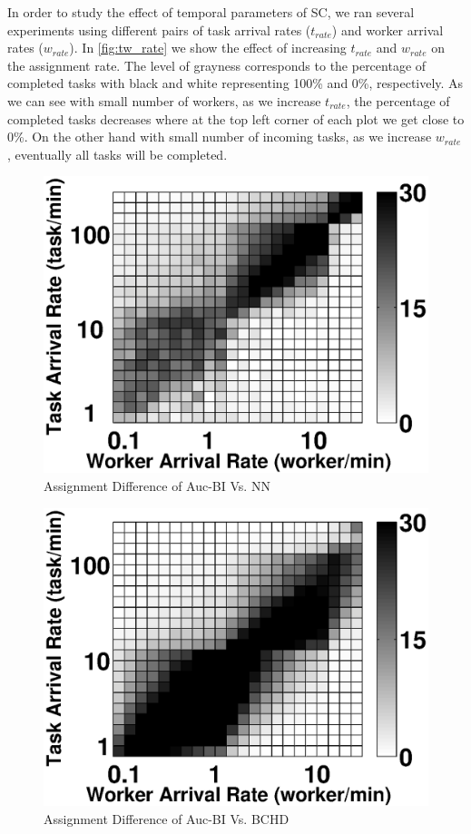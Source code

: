 In order to study the effect of temporal parameters of SC, we ran several experiments using different pairs of task arrival rates ($t_{rate}$) and worker arrival rates ($w_{rate}$). In \cref{fig:tw_rate} we show the effect of increasing $t_{rate}$ and $w_{rate}$ on the assignment rate. The level of grayness corresponds to the percentage of completed tasks with black and white representing 100\% and 0\%, respectively. As we can see with small number of workers, as we increase $t_{rate}$, the percentage of completed tasks decreases where at the top left corner of each plot we get close to 0\%. On the other hand with small number of incoming tasks, as we increase $w_{rate}$, eventually all tasks will be completed.\\

\begin{figure}[h]
	\centering
	\includegraphics[width = 0.65\columnwidth]{figures/bi_nn.eps}
	\vspace{-0.1in}
	\caption{Assignment Difference of Auc-BI Vs. NN}\label{fig:bi_nn}
\end{figure}

\begin{figure}[h]
	\centering
	\includegraphics[width = 0.65\columnwidth]{figures/bi_bchd.eps}
	\vspace{-0.1in}
	\caption{Assignment Difference of Auc-BI Vs. BCHD}\label{fig:bi_bchd}
\end{figure}

